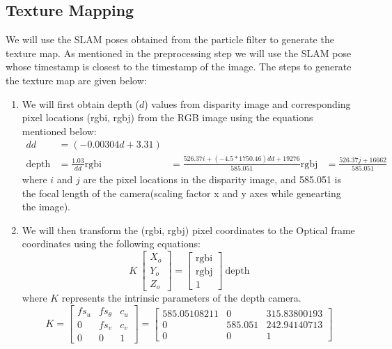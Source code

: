 \documentclass[a4paper]{article}
\begin{document}
\subsection{Texture Mapping}
We will use the SLAM poses obtained from the particle filter to generate the texture map. As mentioned in the preprocessing step we will use the SLAM pose whose timestamp is closest to the timestamp of the image. The steps to generate the texture map are given below:
\begin{enumerate}
    \item We will first obtain depth ($d$) values from disparity image and corresponding pixel locations (rgbi, rgbj) from the RGB image using the equations mentioned below:
    \begin{equation}
        \begin{aligned}
            dd &= (-0.00304d + 3.31) \\
            \text{depth} &= \frac{1.03}{dd}
            \text{rgbi} &= \frac{526.37i + (-4.5 * 1750.46)dd + 19276}{585.051}
            \text{rgbj} &= \frac{526.37j + 16662}{585.051}
        \end{aligned}
    \end{equation}
    where $i$ and $j$ are the pixel locations in the disparity image, and 585.051 is the focal length of the camera(scaling factor x and y axes while genearting the image).
    \item We will then transform the (rgbi, rgbj) pixel coordinates to the Optical frame coordinates using the following equations:
    \begin{equation}
        K \ \begin{bmatrix} X_o \\ Y_o \\ Z_o \end{bmatrix} = \begin{bmatrix} \text{rgbi} \\ \text{rgbj} \\ 1 \end{bmatrix} \ \text{depth}
    \end{equation}
    where $K$ represents the intrinsic parameters of the depth camera.
    \begin{equation}
        K = \begin{bmatrix} fs_u & fs_\theta & c_u \\ 0 & fs_v & c_v \\ 0 & 0 & 1 \end{bmatrix} = \begin{bmatrix} 585.05108211 & 0 & 315.83800193 \\ 0 & 585.051 & 242.94140713 \\ 0 & 0 & 1 \end{bmatrix}

\end{equation}
\end{enumerate}
\end{document}
